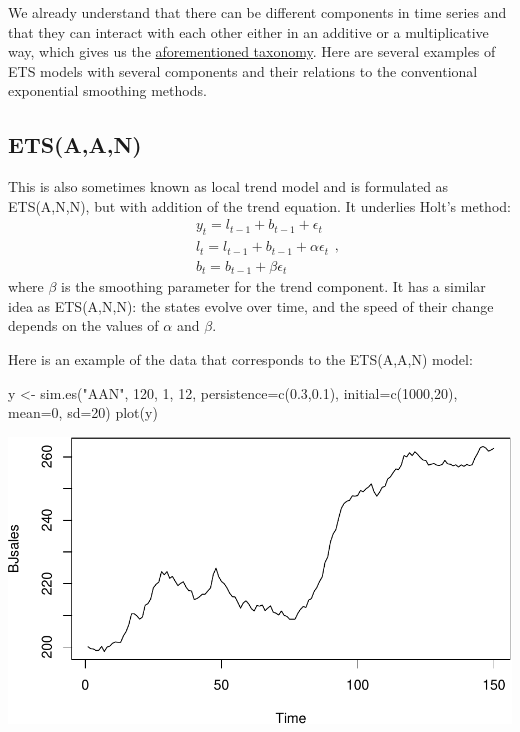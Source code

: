 \documentclass[
]{book}
\newenvironment{Shaded}{\begin{snugshade}}{\end{snugshade}}
\newcommand{\AttributeTok}[1]{\textcolor[rgb]{0.77,0.63,0.00}{#1}}
\newcommand{\DecValTok}[1]{\textcolor[rgb]{0.00,0.00,0.81}{#1}}
\newcommand{\FloatTok}[1]{\textcolor[rgb]{0.00,0.00,0.81}{#1}}
\newcommand{\FunctionTok}[1]{\textcolor[rgb]{0.00,0.00,0.00}{#1}}
\newcommand{\NormalTok}[1]{#1}
\newcommand{\OtherTok}[1]{\textcolor[rgb]{0.56,0.35,0.01}{#1}}
\newcommand{\StringTok}[1]{\textcolor[rgb]{0.31,0.60,0.02}{#1}}
\theoremstyle{definition}
\theoremstyle{definition}
\theoremstyle{definition}
\theoremstyle{definition}
\theoremstyle{remark}
\begin{document}
We already understand that there can be different components in time series and that they can interact with each other either in an additive or a multiplicative way, which gives us the \protect\hyperlink{ETSTaxonomy}{aforementioned taxonomy}. Here are several examples of ETS models with several components and their relations to the conventional exponential smoothing methods.

\hypertarget{ETSAAN}{%
\subsection{ETS(A,A,N)}\label{ETSAAN}}

This is also sometimes known as local trend model and is formulated as ETS(A,N,N), but with addition of the trend equation. It underlies Holt's method:
\begin{equation}
  \begin{aligned}
    & y_{t} = l_{t-1} + b_{t-1} + \epsilon_t \\
    & l_t = l_{t-1} + b_{t-1} + \alpha \epsilon_t \\
    & b_t = b_{t-1} + \beta \epsilon_t
  \end{aligned} ,
  \label{eq:ETSAAN}
\end{equation}
where \(\beta\) is the smoothing parameter for the trend component. It has a similar idea as ETS(A,N,N): the states evolve over time, and the speed of their change depends on the values of \(\alpha\) and \(\beta\).

Here is an example of the data that corresponds to the ETS(A,A,N) model:

\begin{Shaded}
\begin{Highlighting}[]
\NormalTok{y }\OtherTok{\textless{}{-}} \FunctionTok{sim.es}\NormalTok{(}\StringTok{"AAN"}\NormalTok{, }\DecValTok{120}\NormalTok{, }\DecValTok{1}\NormalTok{, }\DecValTok{12}\NormalTok{, }\AttributeTok{persistence=}\FunctionTok{c}\NormalTok{(}\FloatTok{0.3}\NormalTok{,}\FloatTok{0.1}\NormalTok{),}
            \AttributeTok{initial=}\FunctionTok{c}\NormalTok{(}\DecValTok{1000}\NormalTok{,}\DecValTok{20}\NormalTok{), }\AttributeTok{mean=}\DecValTok{0}\NormalTok{, }\AttributeTok{sd=}\DecValTok{20}\NormalTok{)}
\FunctionTok{plot}\NormalTok{(y)}
\end{Highlighting}
\end{Shaded}

\includegraphics{adam_files/figure-latex/unnamed-chunk-24-1.pdf}
\end{document}
